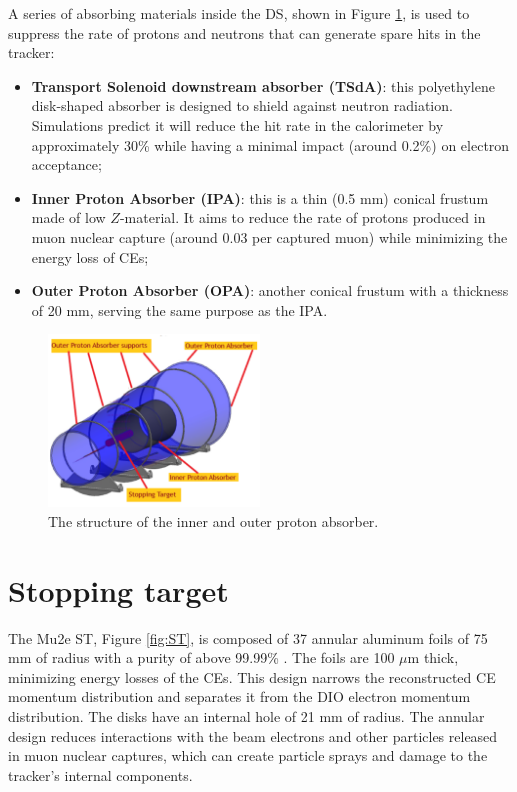 A series of absorbing materials inside the DS, shown in 
Figure \ref{fig:absorbersDS}, is used to suppress 
the rate of protons and neutrons that can generate spare hits in the 
tracker:
\begin{itemize}
    \item \textbf{Transport Solenoid downstream absorber (TSdA)}: this 
    polyethylene disk-shaped absorber is designed to shield against neutron radiation. 
    Simulations predict it will reduce the hit rate in the calorimeter by approximately 30\% 
    while having a minimal impact (around 0.2\%) on electron acceptance;
    \item \textbf{Inner Proton Absorber (IPA)}: this is a thin (0.5 mm) conical 
    frustum made of low $Z$-material. It aims to reduce the rate of protons produced 
    in muon nuclear capture (around 0.03 per captured muon) while minimizing the 
    energy loss of CEs;
    \item \textbf{Outer Proton Absorber (OPA)}: another conical frustum with a 
    thickness of 20 mm, serving the same purpose as the IPA.
\end{itemize}
\begin{figure}[!h]
    \centering
    \includegraphics[width =0.5\textwidth]{figures/png/Screenshot_20240706_132949.png}
    \caption[The structure of the inner and outer proton absorber.]{The structure of the inner and outer proton absorber.}
    \label{fig:absorbersDS}
    \end{figure}




\section{Stopping target}
The Mu2e ST, Figure \ref{fig:ST}, is 
composed of 37 annular aluminum foils of 75 mm of radius with a purity of 
above 99.99\% \cite{bobbb}. The foils are 100 $\mu$m thick, 
minimizing energy losses of the CEs. This design 
narrows the reconstructed CE momentum distribution 
and separates it from the DIO electron momentum distribution. 
The disks have an internal hole of 21 mm of radius.
The annular design reduces interactions with the beam electrons
{\red and other particles released in muon nuclear captures, which can create 
  particle sprays and damage to the tracker's internal components.}

